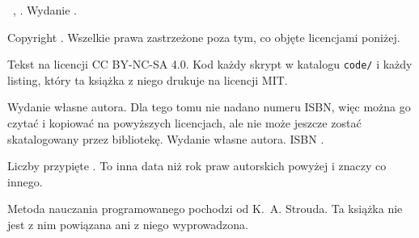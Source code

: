 
\thispagestyle{empty}
\vspace*{\fill}

{\small\color{mgrey}\raggedright\setlength{\parindent}{0pt}%
\emph{\mfaseriestitle} \dash{} \lblVolume~\mfavolnumeral,
\emph{\mfavoltitlehere}. Wydanie \bookedition.

\medskip
Copyright \textcopyright{} \bookyear{} \mfabookauthor. Wszelkie prawa
zastrzeżone poza tym, co objęte licencjami poniżej.

\medskip
Tekst na licencji CC BY-NC-SA 4.0. Kod \dash{} każdy skrypt w katalogu
\texttt{code/} i każdy listing, który ta książka z niego drukuje \dash{} na
licencji MIT.

\medskip
\ifx\mfavolisbn\relax
Wydanie własne autora. Dla tego tomu nie nadano numeru ISBN, więc można go
czytać i kopiować na powyższych licencjach, ale nie może jeszcze zostać
skatalogowany przez bibliotekę.
\else
Wydanie własne autora. ISBN \mfavolisbn.
\fi

\medskip
\lblAiAssist

\medskip
Liczby przypięte \pinnedon. To inna data niż rok praw autorskich powyżej
i znaczy co innego.

\medskip
Metoda nauczania programowanego pochodzi od K.~A. Strouda. Ta książka nie jest
z nim powiązana ani z niego wyprowadzona.
\par}

\cleardoublepage
